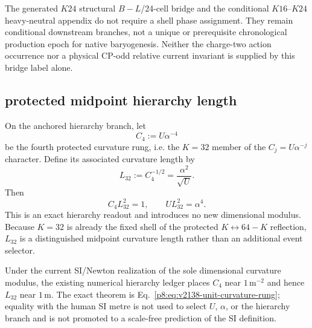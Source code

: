 \documentclass[12pt,a4paper]{article}
\begin{document}
\begin{remark}
\label{p8:rem:v2137-k24-bridge-scope}
The generated \(K24\) structural \(B-L\)/24-cell bridge and the conditional
\(K16\)--\(K24\) heavy-neutral appendix do not require a shell phase
assignment.  They remain conditional downstream branches, not a unique or
prerequisite chronological production epoch for native baryogenesis.
Neither the charge-two action occurrence nor a physical CP-odd relative
current invariant is supplied by this bridge label alone.
\end{remark}


\subsection{protected midpoint hierarchy length}
\label{p8:sec:v2138-k32-native-length}

\begin{corollary}[Native $K=32$ hierarchy curvature length]
\label{p8:cor:v2138-k32-native-length}
On the anchored hierarchy branch, let
\[
 C_4:=U\alpha^{-4}
\]
be the fourth protected curvature rung, i.e. the $K=32$ member of the
$C_j=U\alpha^{-j}$ character.  Define its associated curvature length by
\begin{equation}
\label{p8:eq:v2138-L32}
 \boxed{
 L_{32}:=C_4^{-1/2}=\frac{\alpha^2}{\sqrt U}.}
\end{equation}
Then
\begin{equation}
\label{p8:eq:v2138-unit-curvature-rung}
 \boxed{C_4L_{32}^2=1,\qquad UL_{32}^2=\alpha^4.}
\end{equation}
This is an exact hierarchy readout and introduces no new dimensional modulus.
Because $K=32$ is already the fixed shell of the protected
$K\leftrightarrow64-K$ reflection, $L_{32}$ is a distinguished midpoint
curvature length rather than an additional event selector.
\end{corollary}

\begin{remark}
\label{p8:rem:v2138-k32-metre-firewall}
Under the current SI/Newton realization of the sole dimensional curvature
modulus, the existing numerical hierarchy ledger places $C_4$ near
$1\,\mathrm{m}^{-2}$ and hence $L_{32}$ near $1\,\mathrm m$.  The exact theorem
is Eq.~\eqref{p8:eq:v2138-unit-curvature-rung}; equality with the human SI
metre is not used to select $U$, $\alpha$, or the hierarchy branch and is not
promoted to a scale-free prediction of the SI definition.
\end{remark}
\end{document}
